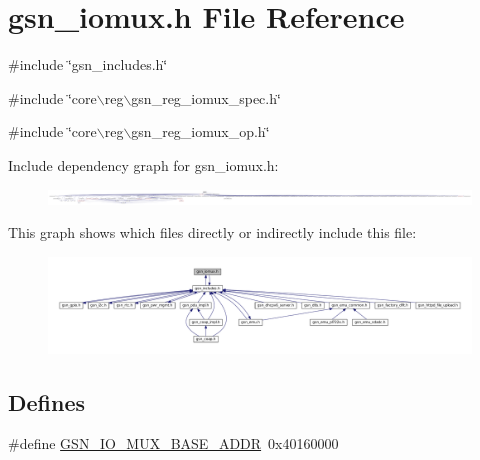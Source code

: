 \hypertarget{a00519}{
\section{gsn\_\-iomux.h File Reference}
\label{a00519}
}
{\ttfamily \#include \char`\"{}gsn\_\-includes.h\char`\"{}}\par
{\ttfamily \#include \char`\"{}core$\backslash$reg$\backslash$gsn\_\-reg\_\-iomux\_\-spec.h\char`\"{}}\par
{\ttfamily \#include \char`\"{}core$\backslash$reg$\backslash$gsn\_\-reg\_\-iomux\_\-op.h\char`\"{}}\par
Include dependency graph for gsn\_\-iomux.h:
\nopagebreak
\begin{figure}[H]
\begin{center}
\leavevmode
\includegraphics[width=400pt]{a00752}
\end{center}
\end{figure}
This graph shows which files directly or indirectly include this file:
\nopagebreak
\begin{figure}[H]
\begin{center}
\leavevmode
\includegraphics[width=400pt]{a00753}
\end{center}
\end{figure}
\subsection*{Defines}
\begin{DoxyCompactItemize}
\item 
\#define \hyperlink{a00519_aa8695a3975db7fcc40f4259bd0c6fc2a}{GSN\_\-IO\_\-MUX\_\-BASE\_\-ADDR}~0x40160000
\end{DoxyCompactItemize}
